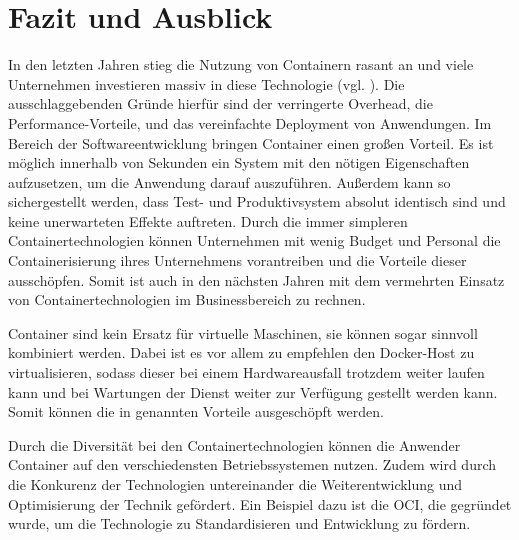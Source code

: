 \section{Fazit und Ausblick} 
\label{sec:Fazit}
In den letzten Jahren stieg die Nutzung von Containern rasant an und viele Unternehmen investieren massiv in diese Technologie (vgl. ). Die ausschlaggebenden Gründe hierfür sind der verringerte Overhead, die Performance-Vorteile, und das vereinfachte Deployment von Anwendungen.  Im Bereich der Softwareentwicklung bringen Container einen großen Vorteil. Es ist möglich innerhalb von Sekunden ein System mit den nötigen Eigenschaften aufzusetzen, um die Anwendung darauf auszuführen. Außerdem kann so sichergestellt werden, dass Test- und Produktivsystem absolut identisch sind und keine unerwarteten Effekte auftreten. Durch die immer simpleren Containertechnologien können Unternehmen mit wenig Budget und Personal die Containerisierung ihres Unternehmens vorantreiben und die Vorteile dieser ausschöpfen. Somit ist auch in den nächsten Jahren mit dem vermehrten Einsatz von Containertechnologien im Businessbereich zu rechnen. 

Container sind kein Ersatz für virtuelle Maschinen, sie können sogar sinnvoll kombiniert werden. Dabei ist es vor allem zu empfehlen den Docker-Host zu virtualisieren, sodass dieser bei einem Hardwareausfall trotzdem weiter laufen kann und bei Wartungen der Dienst weiter zur Verfügung gestellt werden kann. Somit können die in  genannten Vorteile ausgeschöpft werden.

Durch die Diversität bei den Containertechnologien können die Anwender Container auf den verschiedensten Betriebssystemen nutzen. Zudem wird durch die Konkurenz der Technologien untereinander die Weiterentwicklung und Optimisierung der Technik gefördert. Ein Beispiel dazu ist die \ac{OCI}, die gegründet wurde, um die Technologie zu Standardisieren und Entwicklung zu fördern.

